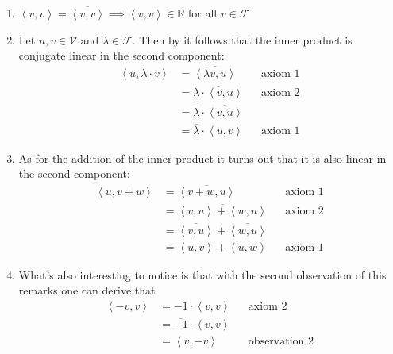 \begin{rem}\label{rem-inner-product}
	\hfill
	\begin{enumerate}
		\item $\left<v,v\right>=\overline{\left<v,v\right>} \implies \left<v,v\right>\in\mathbb{R}$
		      for all $v\in\mathcal{F}$
		\item Let $u,v\in\mathcal{V}$ and $\lambda\in\mathcal{F}$. Then by
		       it follows that the inner
		      product is conjugate linear in the second component:
		      \begin{align*}
			      \left<u,\lambda\cdot v\right> & = \overline{\left<\lambda v,u\right>}                &  & \text{axiom 1} \\
			                                    & = \overline{\lambda\cdot\left<v,u\right>}            &  & \text{axiom 2} \\
			                                    & = \overline{\lambda}\cdot\overline{\left<v,u\right>}                     \\
			                                    & = \overline{\lambda}\cdot\left<u,v\right>            &  & \text{axiom 1}
		      \end{align*}
		\item As for the addition of the inner product it turns out that it is also linear in the
		      second component:
		      \begin{align*}
			      \left<u,v+w\right> & = \overline{\left<v+w,u\right>}                           &  & \text{axiom 1} \\
			                         & = \overline{\left<v,u\right>+\left<w,u\right>}            &  & \text{axiom 2} \\
			                         & = \overline{\left<v,u\right>}+\overline{\left<w,u\right>}                     \\
			                         & = \left<u,v\right> + \left<u,w\right>                     &  & \text{axiom 1}
		      \end{align*}
		\item What's also interesting to notice is that with the second observation of
		      this remarks one can derive that
		      \begin{align*}
			      \left<-v,v\right> & = -1\cdot \left<v,v\right>            &  & \text{axiom 2}       \\
			                        & = \overline{-1}\cdot \left<v,v\right>                           \\
			                        & = \left<v,-v\right>                   &  & \text{observation 2}
		      \end{align*}
	\end{enumerate}
\end{rem}

